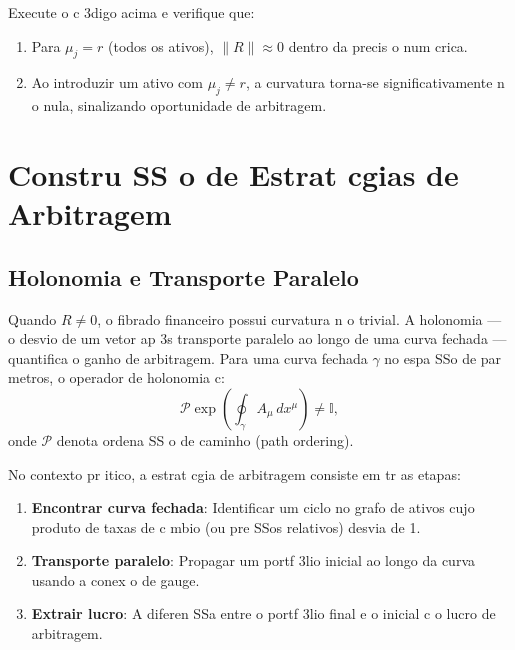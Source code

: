 \begin{ex}
Execute o c 3digo acima e verifique que:
\begin{enumerate}
 \item Para \(\mu_j = r\) (todos os ativos), \(\|R\| \approx 0\) dentro da precis o num crica.
 \item Ao introduzir um ativo com \(\mu_j \neq r\), a curvatura torna-se significativamente n o nula, sinalizando oportunidade de arbitragem.
\end{enumerate}
\end{ex}

\section{Constru SS o de Estrat cgias de Arbitragem}
\label{sec:estrategias-arbitragem}

\subsection{Holonomia e Transporte Paralelo}

Quando \(R \neq 0\), o fibrado financeiro possui curvatura n o trivial. A holonomia --- o desvio de um vetor ap 3s transporte paralelo ao longo de uma curva fechada --- quantifica o ganho de arbitragem. Para uma curva fechada \(\gamma\) no espa SSo de par metros, o operador de holonomia c:
\begin{equation}
 \mathcal{P}\exp\!\left(\oint_\gamma A_\mu\,dx^\mu\right) \neq \mathbb{I},
\end{equation}
onde \(\mathcal{P}\) denota ordena SS o de caminho (path ordering).

No contexto pr itico, a estrat cgia de arbitragem consiste em tr as etapas:
\begin{enumerate}
 \item \textbf{Encontrar curva fechada}: Identificar um ciclo no grafo de ativos cujo produto de taxas de c mbio (ou pre SSos relativos) desvia de 1.
 \item \textbf{Transporte paralelo}: Propagar um portf 3lio inicial ao longo da curva usando a conex o de gauge.
 \item \textbf{Extrair lucro}: A diferen SSa entre o portf 3lio final e o inicial c o lucro de arbitragem.
\end{enumerate}

